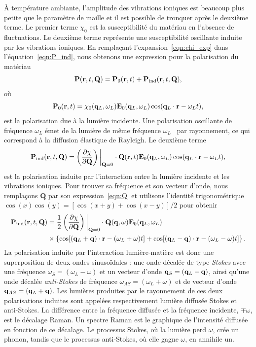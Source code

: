 À température ambiante, l'amplitude des vibrations ioniques est beaucoup plus petite que le paramètre de maille et il est possible de tronquer après le deuxième terme. Le premier terme $\chi_0$ est la susceptibilité du matériau en l'absence de fluctuations. Le deuxième terme représente une susceptibilité oscillante induite par les vibrations ioniques. En remplaçant l'expansion~\eqref{eqn:chi_exp} dans l'équation~\eqref{eqn:P_ind}, nous obtenons une expression pour la polarisation du matériau
\begin{equation}
    \mathbf{P}(\mathbf{r},t,\mathbf{Q}) = \mathbf{P}_0(\mathbf{r},t)+\mathbf{P}_\text{ind}(\mathbf{r},t,\mathbf{Q}),
\end{equation}
où
\begin{equation}
    \mathbf{P}_0(\mathbf{r},t) = \chi_0(\mathbf{q}_L,\omega_L)\mathbf{E}_0(\mathbf{q}_L,\omega_L)\cos(\mathbf{q}_L\cdot\mathbf{r} -\omega_L t),
\end{equation}
est la polarisation due à la lumière incidente. Une polarisation oscillante de fréquence $\omega_L$ émet de la lumière de même fréquence $\omega_L$~\cite{jacksonClassicalElectrodynamics2012} par rayonnement, ce qui correspond à la diffusion élastique de Rayleigh. Le deuxième terme
\begin{equation}
    \mathbf{P}_\text{ind}(\mathbf{r},t,\mathbf{Q})=\left(\frac{\partial \chi}{\partial\mathbf{Q}}\right)\bigg\rvert_{\mathbf{Q}=0}\cdot\mathbf{Q}(\mathbf{r},t)\mathbf{E}_0(\mathbf{q}_L,\omega_L)\cos(\mathbf{q}_L\cdot\mathbf{r}-\omega_L t),
\end{equation}
est la polarisation induite par l'interaction entre la lumière incidente et les vibrations ioniques. Pour trouver sa fréquence et son vecteur d'onde, nous remplaçons $\mathbf{Q}$ par son expression~\eqref{eqn:Q} et utilisons l'identité trigonométrique $\cos(x)\cos(y)=[\cos(x+y)+\cos(x-y)]/2$ pour obtenir
\begin{equation}
    \begin{split}
    \mathbf{P}_\text{ind}(\mathbf{r},t,\mathbf{Q}) &= \frac{1}{2}\left(\frac{\partial \chi}{\partial\mathbf{Q}}\right)\bigg\rvert_{\mathbf{Q}=0}\cdot\mathbf{Q}(\mathbf{q},\omega)\mathbf{E}_0(\mathbf{q}_L,\omega_L)\\
    &\times\left\{\cos[(\mathbf{q}_L+\mathbf{q})\cdot\mathbf{r}-(\omega_L+\omega)t]+\cos[(\mathbf{q}_L-\mathbf{q})\cdot\mathbf{r}-(\omega_L-\omega)t]\right\}.
    \end{split}\label{eqn:P_Raman}
\end{equation}
La polarisation induite par l'interaction lumière-matière est donc une superposition de deux ondes sinusoïdales : une onde décalée de type \textit{Stokes} avec une fréquence $\omega_S=(\omega_L-\omega)$ et un vecteur d'onde $\mathbf{q}_S=(\mathbf{q}_L-\mathbf{q})$, ainsi qu'une onde décalée \textit{anti-Stokes} de fréquence $\omega_{AS}=(\omega_L+\omega)$ et de vecteur d'onde $\mathbf{q}_{AS}=(\mathbf{q}_L+\mathbf{q})$. Les lumières produites par le rayonnement de ces deux polarisations induites sont appelées respectivement lumière diffusée Stokes et anti-Stokes. La différence entre la fréquence diffusée et la fréquence incidente, $\mp\omega$, est le décalage Raman. Un spectre Raman est le graphique de l'intensité diffusée en fonction de ce décalage. Le processus Stokes, où la lumière perd $\omega$, crée un phonon, tandis que le processus anti-Stokes, où elle gagne $\omega$, en annihile un.

